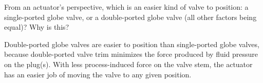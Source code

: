 

From an actuator's perspective, which is an easier kind of valve to position: a single-ported globe valve, or a double-ported globe valve (all other factors being equal)?  Why is this?







Double-ported globe valves are easier to position than single-ported globe valves, because double-ported valve trim minimizes the force produced by fluid pressure on the plug(s).  With less process-induced force on the valve stem, the actuator has an easier job of moving the valve to any given position.











